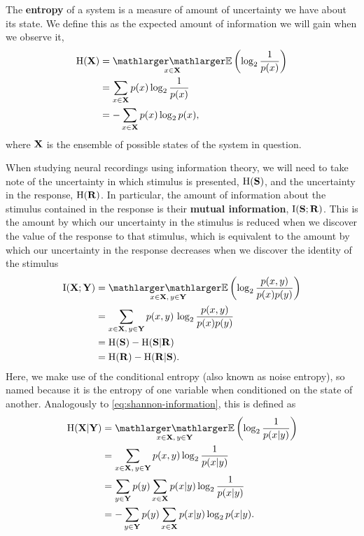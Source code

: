 The \textbf{entropy} of a system is a measure of amount of uncertainty we have about its state.
We define this as the expected amount of information we will gain when we observe it,
\begin{align}
\HH( \SET{X} )
  &= \EE_{x \in \SET{X}} \left( \log_2 \frac{1}{p(x)} \right) \notag
\\&= \sum_{x \in \SET{X}} p(x) \log_2 \frac{1}{p(x)} \notag
\\&= - \sum_{x \in \SET{X}} p(x) \log_2 p(x)
,\end{align}
where $\mathbf{X}$ is the ensemble of possible states of the system in question.

When studying neural recordings using information theory, we will need to take note of the uncertainty in which stimulus is presented, $\operatorname{H}(\mathbf{S})$, and the uncertainty in the response, $\operatorname{H}(\mathbf{R})$.
In particular, the amount of information about the stimulus contained in the response is their \textbf{mutual information}, $\operatorname{I}(\mathbf{S};\mathbf{R})$.
This is the amount by which our uncertainty in the stimulus is reduced when we discover the value of the response to that stimulus, which is equivalent to the amount by which our uncertainty in the response decreases when we discover the identity of the stimulus
\begin{align}
\I(\SET{X};\SET{Y})
  &= \EE_{x \in \SET{X}, \, y \in \SET{Y}} \left( \log_2 \frac{p(x,y)}{p(x)p(y)} \right) \notag
\\&= \sum_{x \in \SET{X}, \, y \in \SET{Y}} p(x,y) \, \log_2 \frac{p(x,y)}{p(x)p(y)} \notag
\\&= \HH(\SET{S}) - \HH(\SET{S} | \SET{R}) \notag
\\&= \HH(\SET{R}) - \HH(\SET{R} | \SET{S}) \label{eq:info}
.\end{align}
Here, we make use of the conditional entropy (also known as noise entropy), so named because it is the entropy of one variable when conditioned on the state of another.
Analogously to \autoref{eq:shannon-information}, this is defined as
\begin{align}
\HH(\SET{X} | \SET{Y})
  &= \EE_{x \in \SET{X}, \, y \in \SET{Y}} \left( \log_2 \frac{1}{p(x|y)} \right) \notag
\\&= \sum_{x \in \SET{X}, \, y \in \SET{Y}} p(x,y) \log_2 \frac{1}{p(x|y)} \notag
\\&= \sum_{y \in \SET{Y}} p(y) \sum_{x \in \SET{X}} p(x|y) \log_2 \frac{1}{p(x|y)} \notag
\\&= - \sum_{y \in \SET{Y}} p(y) \sum_{x \in \SET{X}} p(x|y) \log_2 p(x|y)
.\end{align}


